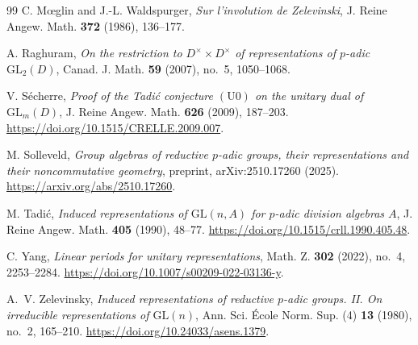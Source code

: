 \documentclass[11pt,leqno]{amsart}
\numberwithin{equation}{section}
\theoremstyle{plain}
\theoremstyle{definition}
\theoremstyle{remark}
\begin{document}
\begin{thebibliography}{99}
		C. M\oe glin and J.-L. Waldspurger,
		\emph{Sur l'involution de Zelevinski},
		J. Reine Angew. Math. \textbf{372} (1986), 136--177.
		
		A. Raghuram,
		\emph{On the restriction to $D^\times\times D^\times$
			of representations of $p$-adic $\mathrm{GL}_2(D)$},
		Canad. J. Math. \textbf{59} (2007),
		no.~5, 1050--1068.
		
		V. S\'echerre,
		\emph{Proof of the Tadi\'c conjecture $(\mathrm{U}0)$
			on the unitary dual of $\mathrm{GL}_m(D)$},
		J. Reine Angew. Math. \textbf{626} (2009), 187--203.
		\url{https://doi.org/10.1515/CRELLE.2009.007}.
		
		M. Solleveld,
		\emph{Group algebras of reductive $p$-adic groups,
			their representations and their noncommutative geometry},
		preprint, arXiv:2510.17260 (2025).
		\url{https://arxiv.org/abs/2510.17260}.
		
		M. Tadi\'c,
		\emph{Induced representations of $\mathrm{GL}(n,A)$
			for $p$-adic division algebras $A$},
		J. Reine Angew. Math. \textbf{405} (1990), 48--77.
		\url{https://doi.org/10.1515/crll.1990.405.48}.
		
		C. Yang,
		\emph{Linear periods for unitary representations},
		Math. Z. \textbf{302} (2022),
		no.~4, 2253--2284.
		\url{https://doi.org/10.1007/s00209-022-03136-y}.
		
		A.~V. Zelevinsky,
		\emph{Induced representations of reductive $p$-adic groups.
			II. On irreducible representations of $\mathrm{GL}(n)$},
		Ann. Sci. \'Ecole Norm. Sup. (4) \textbf{13} (1980),
		no.~2, 165--210.
		\url{https://doi.org/10.24033/asens.1379}.
		
	\end{thebibliography}
	
\end{document}
